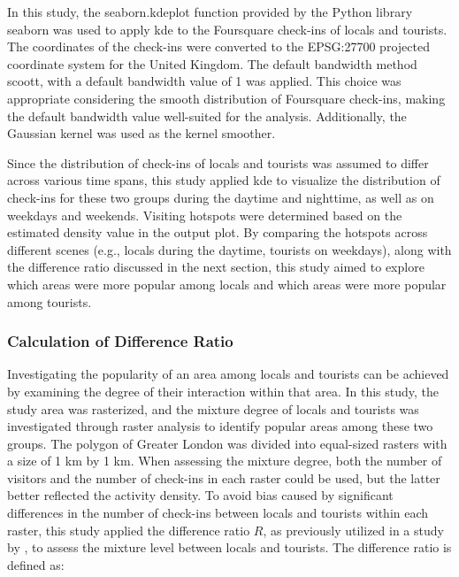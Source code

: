 \documentclass{article}
\theoremstyle{definition}
\theoremstyle{remark}
\begin{document}
In this study, the seaborn.kdeplot function provided by the Python library seaborn \citep{waskom_seaborn_2021} was used to apply \acrshort{kde} to the Foursquare check-ins of locals and tourists. The coordinates of the check-ins were converted to the EPSG:27700 projected coordinate system for the United Kingdom. The default bandwidth method scoott, with a default bandwidth value of 1 was applied. This choice was appropriate considering the smooth distribution of Foursquare check-ins, making the default bandwidth value well-suited for the analysis. Additionally, the Gaussian kernel was used as the kernel smoother.

Since the distribution of check-ins of locals and tourists was assumed to differ across various time spans, this study applied \acrshort{kde} to visualize the distribution of check-ins for these two groups during the daytime and nighttime, as well as on weekdays and weekends. Visiting hotspots were determined based on the estimated density value in the output plot. By comparing the hotspots across different scenes (e.g., locals during the daytime, tourists on weekdays), along with the difference ratio discussed in the next section, this study aimed to explore which areas were more popular among locals and which areas were more popular among tourists.


\subsubsection{Calculation of Difference Ratio}
Investigating the popularity of an area among locals and tourists can be achieved by examining the degree of their interaction within that area. In this study, the study area was rasterized, and the mixture degree of locals and tourists was investigated through raster analysis to identify popular areas among these two groups. The polygon of Greater London was divided into equal-sized rasters with a size of 1 km by 1 km. When assessing the mixture degree, both the number of visitors and the number of check-ins in each raster could be used, but the latter better reflected the activity density. To avoid bias caused by significant differences in the number of check-ins between locals and tourists within each raster, this study applied the difference ratio $R$, as previously utilized in a study by \cite{li_analyzing_2018}, to assess the mixture level between locals and tourists. The difference ratio is defined as:
\end{document}
